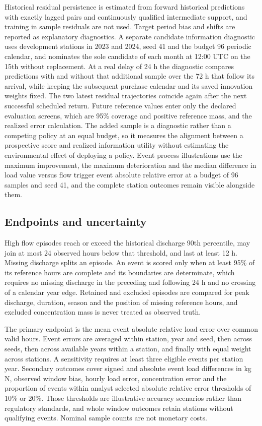 \documentclass[pdflatex,sn-mathphys-num]{sn-jnl}%
\theoremstyle{thmstyleone}%
\theoremstyle{thmstyletwo}%
\theoremstyle{thmstylethree}%
\begin{document}
Historical residual persistence is estimated from forward historical predictions with exactly lagged pairs and continuously qualified intermediate support, and training in sample residuals are not used. Target period bias and shifts are reported as explanatory diagnostics. A separate candidate information diagnostic uses development stations in 2023 and 2024, seed 41 and the budget 96 periodic calendar, and nominates the sole candidate of each month at 12:00 UTC on the 15th without replacement. At a real delay of 24 h the diagnostic compares predictions with and without that additional sample over the 72 h that follow its arrival, while keeping the subsequent purchase calendar and its saved innovation weights fixed. The two latest residual trajectories coincide again after the next successful scheduled return. Future reference values enter only the declared evaluation screens, which are 95\% coverage and positive reference mass, and the realized error calculation. The added sample is a diagnostic rather than a competing policy at an equal budget, so it measures the alignment between a prospective score and realized information utility without estimating the environmental effect of deploying a policy. Event process illustrations use the maximum improvement, the maximum deterioration and the median difference in load value versus flow trigger event absolute relative error at a budget of 96 samples and seed 41, and the complete station outcomes remain visible alongside them.

\subsection{Endpoints and uncertainty}

High flow episodes reach or exceed the historical discharge 90th percentile, may join at most 24 observed hours below that threshold, and last at least 12 h. Missing discharge splits an episode. An event is scored only when at least 95\% of its reference hours are complete and its boundaries are determinate, which requires no missing discharge in the preceding and following 24 h and no crossing of a calendar year edge. Retained and excluded episodes are compared for peak discharge, duration, season and the position of missing reference hours, and excluded concentration mass is never treated as observed truth.

The primary endpoint is the mean event absolute relative load error over common valid hours. Event errors are averaged within station, year and seed, then across seeds, then across available years within a station, and finally with equal weight across stations. A sensitivity requires at least three eligible events per station year. Secondary outcomes cover signed and absolute event load differences in kg N, observed window bias, hourly load error, concentration error and the proportion of events within analyst selected absolute relative error thresholds of 10\% or 20\%. Those thresholds are illustrative accuracy scenarios rather than regulatory standards, and whole window outcomes retain stations without qualifying events. Nominal sample counts are not monetary costs.
\end{document}
